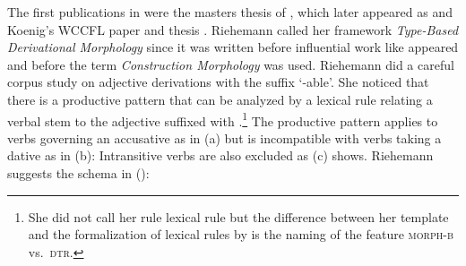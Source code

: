 \documentclass[output=paper]{langsci/langscibook}
\begin{document}
The first publications in  were the masters thesis of \citet{Riehemann93a},
which later appeared as \citet{Riehemann98a} and Koenig's WCCFL paper and thesis
\citep{Koenig93a,Koenig94a-u,Koenig99a}. Riehemann called her framework \emph{Type-Based Derivational
  Morphology} since it was written before influential work like  
appeared and before the term \emph{Construction Morphology} \citep{Booij2005a} was used. Riehemann did a careful corpus study on adjective
derivations with the suffix  `-able'. She noticed that there is a productive pattern
that can be analyzed by a lexical rule relating a verbal stem to the adjective suffixed with
.\footnote{
  She did not call her rule lexical rule but the difference between her template and the
  formalization of lexical rules by \citet{Meurers2001a} is the naming of the feature \textsc{morph-b}
  vs.\ \textsc{dtr}.
} The productive pattern applies to verbs governing an accusative as in (a) but
is incompatible with verbs taking a dative as in (b):
\eal
{}
\zl
Intransitive verbs are also excluded as (c) shows. Riehemann suggests the schema in
():
\ea
\label{ex-schema-bar}
\end{document}
